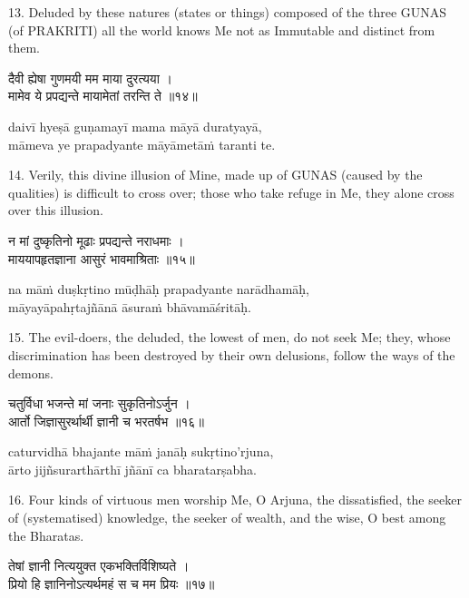 13. Deluded by these natures (states or things) composed of the three GUNAS (of
PRAKRITI) all the world knows Me not as Immutable and distinct from them.

\begin{gitaverse}
दैवी ह्येषा गुणमयी मम माया दुरत्यया । \\
मामेव ये प्रपद्यन्ते मायामेतां तरन्ति ते ॥१४॥
\end{gitaverse}

\begin{transliteration}
daivī hyeṣā guṇamayī mama māyā duratyayā, \\
māmeva ye prapadyante māyāmetāṁ taranti te.
\end{transliteration}

14. Verily, this divine illusion of Mine, made up of GUNAS (caused by the
qualities) is difficult to cross over; those who take refuge in Me, they alone
cross over this illusion.

\begin{gitaverse}
न मां दुष्कृतिनो मूढाः प्रपद्यन्ते नराधमाः । \\
माययापहृतज्ञाना आसुरं भावमाश्रिताः ॥१५॥
\end{gitaverse}

\begin{transliteration}
na māṁ duṣkṛtino mūḍhāḥ prapadyante narādhamāḥ, \\
māyayāpahṛtajñānā āsuraṁ bhāvamāśritāḥ.
\end{transliteration}

15. The evil-doers, the deluded, the lowest of men, do not seek Me; they, whose
discrimination has been destroyed by their own delusions, follow the ways of
the demons.

\begin{gitaverse}
चतुर्विधा भजन्ते मां जनाः सुकृतिनोऽर्जुन । \\
आर्तो जिज्ञासुरर्थार्थी ज्ञानी च भरतर्षभ ॥१६॥
\end{gitaverse}

\begin{transliteration}
caturvidhā bhajante māṁ janāḥ sukṛtino'rjuna, \\
ārto jijñsurarthārthī jñānī ca bharatarṣabha.
\end{transliteration}

16. Four kinds of virtuous men worship Me, O Arjuna, the dissatisfied, the
seeker of (systematised) knowledge, the seeker of wealth, and the wise, O best
among the Bharatas.

\begin{gitaverse}
तेषां ज्ञानी नित्ययुक्त एकभक्तिर्विशिष्यते । \\
प्रियो हि ज्ञानिनोऽत्यर्थमहं स च मम प्रियः ॥१७॥
\end{gitaverse}

